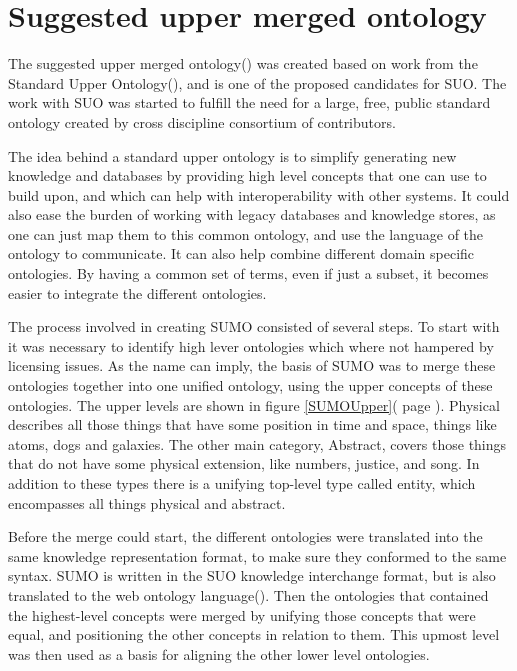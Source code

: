 \section{Suggested upper merged ontology}
The suggested upper merged ontology() was created based on work from the Standard Upper Ontology(),
and is one of the proposed candidates for SUO.
The work with SUO was started to fulfill the need for a large, free, public standard ontology
created by cross discipline consortium of contributors.

The idea behind a standard upper ontology is to simplify generating new knowledge and databases
by providing high level concepts that one can use to build upon,
and which can help with interoperability with other systems.
It could also ease the burden of working with legacy databases and knowledge stores,
as one can just map them to this common ontology, and use the language of the ontology to communicate.
It can also help combine different domain specific ontologies.
By having a common set of terms, even if just a subset,
it becomes easier to integrate the different ontologies\citep{Niles2001}.

The process involved in creating SUMO consisted of several steps.
To start with it was necessary to identify high lever ontologies which where not hampered by licensing issues.
As the name can imply, the basis of SUMO was to merge these ontologies together into one unified ontology,
using the upper concepts of these ontologies.
The upper levels are shown in figure \ref{SUMOUpper}( page \pageref{SUMOUpper}).
Physical describes all those things that have some position in time and space, things like atoms, dogs and galaxies.
The other main category, Abstract, covers those things that do not have some physical extension, like numbers,
justice, and song.
In addition to these types there is a unifying top-level type called entity, which encompasses all things physical and abstract.

Before the merge could start, the different ontologies were translated into the same knowledge representation format,
to make sure they conformed to the same syntax\citep{Niles2001}.
SUMO is written in the SUO knowledge interchange format,
but is also translated to the web ontology language()\citep{Benzmuller2012}.
Then the ontologies that contained the highest-level concepts were merged by unifying those concepts that were equal,
and positioning the other concepts in relation to them.
This upmost level was then used as a basis for aligning the other lower level ontologies\citep{Niles2001}.


